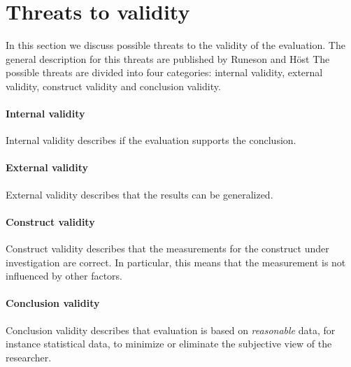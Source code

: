 
\section{Threats to validity}

In this section we discuss possible threats to the validity of the evaluation. The general description for this threats are published by Runeson and Höst \cite{TtoV} %
The possible threats are divided into four categories: internal validity, external validity, construct validity and conclusion validity.
\paragraph{Internal validity}
Internal validity describes if the evaluation supports the conclusion. 
\paragraph{External validity}
External validity describes that the results can be generalized.
\paragraph{Construct validity}
Construct validity describes that the measurements for the construct under investigation are correct. In particular, this means that the measurement is not influenced by other factors.
\paragraph{Conclusion validity}
Conclusion validity describes that evaluation is based on \textit{reasonable} data, for instance statistical data, to minimize or eliminate the subjective view of the researcher.
